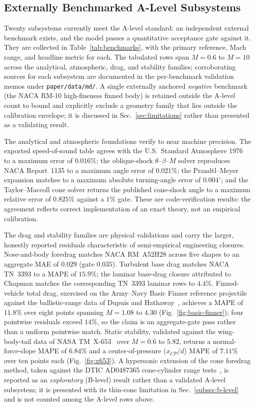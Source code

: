 \subsection{Externally Benchmarked A-Level Subsystems}
\label{subsec:a-level}

Twenty subsystems currently meet the A-level standard: an independent
external benchmark exists, and the model passes a quantitative acceptance gate
against it. They are collected in Table~\ref{tab:benchmarks},
with the primary reference, Mach range, and headline metric for each. The
tabulated rows span $M = 0.6$ to $M = 10$ across the analytical, atmospheric,
drag, and stability families; corroborating sources for each subsystem are
documented in the per-benchmark validation memos under
\texttt{paper/data/md/}. A single externally anchored \emph{negative} benchmark
(the NACA RM-10 high-fineness finned body) is retained outside the A-level count
to bound and explicitly exclude a geometry family that lies outside the
calibration envelope; it is discussed in Sec.~\ref{sec:limitations} rather than
presented as a validating result.

The analytical and atmospheric foundations verify to near machine precision. The
exported speed-of-sound table agrees with the U.S.\ Standard Atmosphere
1976~\cite{nasa1976ussa} to a maximum error of $0.016\%$; the oblique-shock
$\theta$--$\beta$--$M$ solver reproduces NACA Report~1135 to a maximum angle
error of $0.021\%$; the Prandtl--Meyer expansion matches to a maximum absolute
turning-angle error of $0.004^{\circ}$; and the Taylor--Maccoll cone solver
returns the published cone-shock angle to a maximum relative error of $0.825\%$
against a $1\%$ gate. These are code-verification results: the agreement reflects
correct implementation of an exact theory, not an empirical calibration.

The drag and stability families are physical validations and carry the larger,
honestly reported residuals characteristic of semi-empirical engineering
closures. Nose-and-body foredrag matches NACA RM~A52H28 across five shapes to an
aggregate MAE of $0.029$ (gate $0.035$). Turbulent base drag matches NACA
TN~3393 to a MAPE of $15.9\%$; the laminar base-drag closure attributed to
Chapman matches the corresponding TN~3393 laminar rows to $4.4\%$. Finned-vehicle
total drag, exercised on the Army--Navy Basic Finner reference projectile against
the ballistic-range data of Dupuis and Hathaway~\cite{dupuis1997}, achieves a
MAPE of $11.8\%$ over eight points spanning $M = 1.08$ to $4.30$
(Fig.~\ref{fig:basic-finner}); four pointwise residuals exceed $14\%$, so the
claim is an aggregate-gate pass rather than a uniform pointwise match.
Static stability, validated against the wing-body-tail data of NASA
TM~X-653~\cite{nielsen1962} over $M = 0.6$ to $5.82$, returns a normal-force-slope
MAPE of $6.84\%$ and a center-of-pressure ($x_{CP}/d$) MAPE of $7.11\%$ over ten
points each (Fig.~\ref{fig:x653}). A hypersonic extension of the cone foredrag
method, taken against the DTIC AD0487365 cone-cylinder range
tests~\cite{grabow1965}, is reported as an \emph{exploratory} (B-level) result
rather than a validated A-level subsystem; it is presented with its thin-cone
limitation in Sec.~\ref{subsec:b-level} and is not counted among the A-level
rows above.

